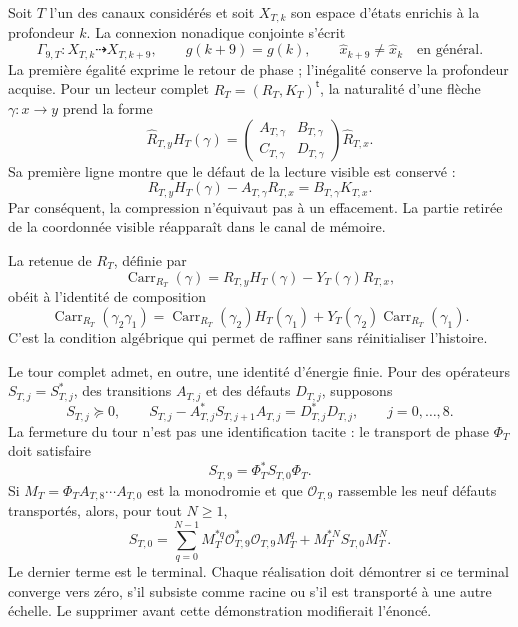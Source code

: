 Soit \(T\) l'un des canaux considérés et soit
\(X_{T,k}\) son espace d'états enrichis à la profondeur \(k\). La
connexion nonadique conjointe s'écrit
\begin{equation}\label{eq:realizaciones-gamma9}
 \Gamma_{9,T}:X_{T,k}\dashrightarrow X_{T,k+9},
 \qquad g(k+9)=g(k),
 \qquad \widehat x_{k+9}\neq\widehat x_k
 \quad\text{en général}.
\end{equation}
La première égalité exprime le retour de phase ; l'inégalité conserve la
profondeur acquise. Pour un lecteur complet
\(\widehat R_T=(R_T,K_T)^{\mathsf t}\), la naturalité d'une flèche
\(\gamma:x\to y\) prend la forme
\begin{equation}\label{eq:realizaciones-lrdn}
 \widehat R_{T,y}H_T(\gamma)=
 \begin{pmatrix}
  A_{T,\gamma}&B_{T,\gamma}\\
  C_{T,\gamma}&D_{T,\gamma}
 \end{pmatrix}
 \widehat R_{T,x}.
\end{equation}
Sa première ligne montre que le défaut de la lecture visible est conservé :
\begin{equation}\label{eq:realizaciones-defecto-visible}
 R_{T,y}H_T(\gamma)-A_{T,\gamma}R_{T,x}
 =B_{T,\gamma}K_{T,x}.
\end{equation}
Par conséquent, la compression n'équivaut pas à un effacement. La partie retirée de la
coordonnée visible réapparaît dans le canal de mémoire.

La retenue de \(R_T\), définie par
\[
 \operatorname{Carr}_{R_T}(\gamma)
 =R_{T,y}H_T(\gamma)-Y_T(\gamma)R_{T,x},
\]
obéit à l'identité de composition
\begin{equation}\label{eq:realizaciones-cociclo-acarreo}
 \operatorname{Carr}_{R_T}(\gamma_2\gamma_1)
 =\operatorname{Carr}_{R_T}(\gamma_2)H_T(\gamma_1)
 +Y_T(\gamma_2)\operatorname{Carr}_{R_T}(\gamma_1).
\end{equation}
C'est la condition algébrique qui permet de raffiner sans réinitialiser
l'histoire.

Le tour complet admet, en outre, une identité d'énergie finie. Pour des
opérateurs \(S_{T,j}=S_{T,j}^*\), des transitions \(A_{T,j}\) et des défauts
\(D_{T,j}\), supposons
\[
 S_{T,j}\succeq0,
 \qquad
 S_{T,j}-A_{T,j}^*S_{T,j+1}A_{T,j}=D_{T,j}^*D_{T,j},
 \qquad j=0,\ldots,8.
\]
La fermeture du tour n'est pas une identification tacite : le transport de
phase \(\Phi_T\) doit satisfaire
\begin{equation}\label{eq:realizaciones-cierre-forma}
 S_{T,9}=\Phi_T^*S_{T,0}\Phi_T.
\end{equation}
Si \(M_T=\Phi_TA_{T,8}\cdots A_{T,0}\) est la monodromie et que
\(\mathcal O_{T,9}\) rassemble les neuf défauts transportés, alors, pour
tout \(N\geq1\),
\begin{equation}\label{eq:realizaciones-telescopia-terminal}
 S_{T,0}
 =\sum_{q=0}^{N-1}
 M_T^{*q}\mathcal O_{T,9}^*\mathcal O_{T,9}M_T^q
 +M_T^{*N}S_{T,0}M_T^N.
\end{equation}
Le dernier terme est le terminal. Chaque réalisation doit démontrer si ce
terminal converge vers zéro, s'il subsiste comme racine ou s'il est transporté à une autre
échelle. Le supprimer avant cette démonstration modifierait l'énoncé.

